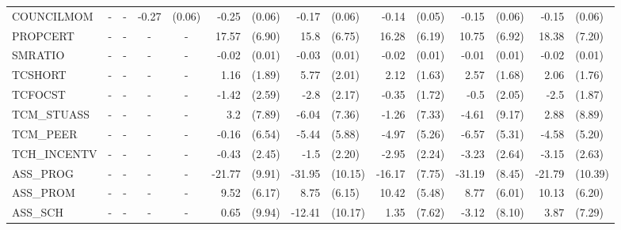 \documentclass[10pt]{article}
\begin{document}
\begin{table}[htbp]
\begin{tabular}{lrlrlrlrlrlrlrl}
COUNCILMOM & \multicolumn{1}{c}{-} & \multicolumn{1}{c}{-} & -0.27 & (0.06) & -0.25 & (0.06) & -0.17 & (0.06) & -0.14 & (0.05) & -0.15 & (0.06) & -0.15 & (0.06) \\[0.2em]
PROPCERT & \multicolumn{1}{c}{-} & \multicolumn{1}{c}{-} & \multicolumn{1}{c}{-} & \multicolumn{1}{c}{-} & 17.57 & (6.90) & 15.8  & (6.75) & 16.28 & (6.19) & 10.75 & (6.92) & 18.38 & (7.20) \\[0.2em]
SMRATIO & \multicolumn{1}{c}{-} & \multicolumn{1}{c}{-} & \multicolumn{1}{c}{-} & \multicolumn{1}{c}{-} & -0.02 & (0.01) & -0.03 & (0.01) & -0.02 & (0.01) & -0.01 & (0.01) & -0.02 & (0.01) \\[0.2em]
TCSHORT & \multicolumn{1}{c}{-} & \multicolumn{1}{c}{-} & \multicolumn{1}{c}{-} & \multicolumn{1}{c}{-} & 1.16  & (1.89) & 5.77  & (2.01) & 2.12  & (1.63) & 2.57  & (1.68) & 2.06  & (1.76) \\[0.2em]
TCFOCST & \multicolumn{1}{c}{-} & \multicolumn{1}{c}{-} & \multicolumn{1}{c}{-} & \multicolumn{1}{c}{-} & -1.42 & (2.59) & -2.8  & (2.17) & -0.35 & (1.72) & -0.5  & (2.05) & -2.5  & (1.87) \\[0.2em]
TCM\_STUASS & \multicolumn{1}{c}{-} & \multicolumn{1}{c}{-} & \multicolumn{1}{c}{-} & \multicolumn{1}{c}{-} & 3.2   & (7.89) & -6.04 & (7.36) & -1.26 & (7.33) & -4.61 & (9.17) & 2.88  & (8.89) \\[0.2em]
TCM\_PEER & \multicolumn{1}{c}{-} & \multicolumn{1}{c}{-} & \multicolumn{1}{c}{-} & \multicolumn{1}{c}{-} & -0.16 & (6.54) & -5.44 & (5.88) & -4.97 & (5.26) & -6.57 & (5.31) & -4.58 & (5.20) \\[0.2em]
TCH\_INCENTV & \multicolumn{1}{c}{-} & \multicolumn{1}{c}{-} & \multicolumn{1}{c}{-} & \multicolumn{1}{c}{-} & -0.43 & (2.45) & -1.5  & (2.20) & -2.95 & (2.24) & -3.23 & (2.64) & -3.15 & (2.63) \\[0.2em]
ASS\_PROG & \multicolumn{1}{c}{-} & \multicolumn{1}{c}{-} & \multicolumn{1}{c}{-} & \multicolumn{1}{c}{-} & -21.77 & (9.91) & -31.95 & (10.15) & -16.17 & (7.75) & -31.19 & (8.45) & -21.79 & (10.39) \\[0.2em]
ASS\_PROM & \multicolumn{1}{c}{-} & \multicolumn{1}{c}{-} & \multicolumn{1}{c}{-} & \multicolumn{1}{c}{-} & 9.52  & (6.17) & 8.75  & (6.15) & 10.42 & (5.48) & 8.77  & (6.01) & 10.13 & (6.20) \\[0.2em]
ASS\_SCH & \multicolumn{1}{c}{-} & \multicolumn{1}{c}{-} & \multicolumn{1}{c}{-} & \multicolumn{1}{c}{-} & 0.65  & (9.94) & -12.41 & (10.17) & 1.35  & (7.62) & -3.12 & (8.10) & 3.87  & (7.29) \\[0.2em]

\end{tabular}
\end{table}
\end{document}
